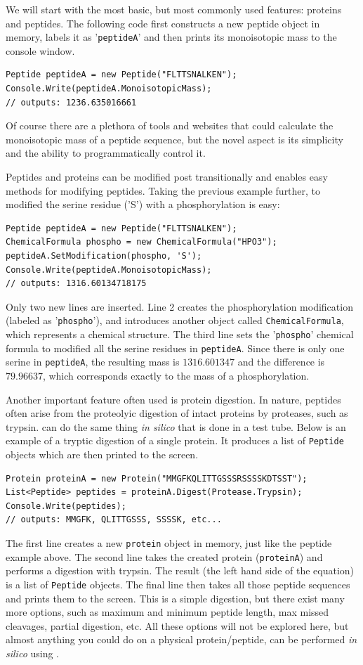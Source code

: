 We will start with the most basic, but most commonly used features: proteins and peptides. The following code first constructs a new peptide object in memory, labels it as '\texttt{peptideA}' and then prints its monoisotopic mass to the console window.
\begin{lstlisting}
Peptide peptideA = new Peptide("FLTTSNALKEN");
Console.Write(peptideA.MonoisotopicMass);
// outputs: 1236.635016661
\end{lstlisting}
Of course there are a plethora of tools and websites that could calculate the monoisotopic mass of a peptide sequence, but the novel aspect is its simplicity and the ability to programmatically control it.

Peptides and proteins can be modified post transitionally and \csmsl{} enables easy methods for modifying peptides. Taking the previous example further, to modified the serine residue ('S') with a phosphorylation is easy:
\begin{lstlisting}
Peptide peptideA = new Peptide("FLTTSNALKEN");
ChemicalFormula phospho = new ChemicalFormula("HPO3");
peptideA.SetModification(phospho, 'S');
Console.Write(peptideA.MonoisotopicMass);
// outputs: 1316.60134718175
\end{lstlisting}
Only two new lines are inserted. Line 2 creates the phosphorylation modification (labeled as '\texttt{phospho}'), and introduces another \csmsl{} object called \texttt{ChemicalFormula}, which represents a chemical structure. The third line sets the '\texttt{phospho}' chemical formula to modified all the serine residues in \texttt{peptideA}. Since there is only one serine in \texttt{peptideA}, the resulting mass is $1316.601347$ and the difference is $79.96637$, which corresponds exactly to the mass of a phosphorylation.

Another important feature often used is protein digestion. In nature, peptides often arise from the proteolyic digestion of intact proteins by proteases, such as trypsin. \csmsl{} can do the same thing \emph{in silico} that is done in a test tube. Below is an example of a tryptic digestion of a single protein. It produces a list of \texttt{Peptide} objects which are then printed to the screen.
\begin{lstlisting}
Protein proteinA = new Protein("MMGFKQLITTGSSSRSSSSKDTSST");
List<Peptide> peptides = proteinA.Digest(Protease.Trypsin);
Console.Write(peptides);
// outputs: MMGFK, QLITTGSSS, SSSSK, etc...
\end{lstlisting}
The first line creates a new \texttt{protein} object in memory, just like the peptide example above. The second line takes the created protein (\texttt{proteinA}) and performs a digestion with trypsin. The result (the left hand side of the equation) is a list of \texttt{Peptide} objects. The final line then takes all those peptide sequences and prints them to the screen. This is a simple digestion, but there exist many more options, such as maximum and minimum peptide length, max missed cleavages, partial digestion, etc. All these options will not be explored here, but almost anything you could do on a physical protein/peptide, can be performed \emph{in silico} using \csmsl{}.

